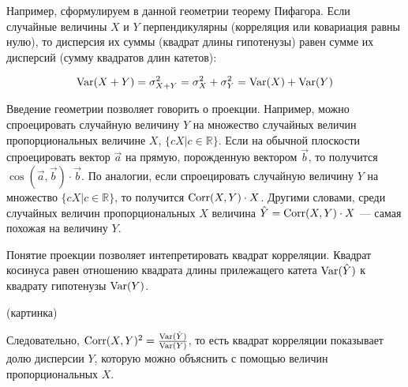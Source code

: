 \documentclass[10pt]{article}
\newcommand{\RR}{\mathbb{R}}
\begin{document}
Например, сформулируем в данной геометрии теорему Пифагора. Если случайные величины $X$ и $Y$ перпендикулярны (корреляция или ковариация равны нулю), то дисперсия их суммы (квадрат длины гипотенузы) равен сумме их дисперсий (сумму квадратов длин катетов):

\[
\operatorname{Var}(X+Y)=\sigma^2_{X+Y}=\sigma^2_X+\sigma^2_Y=\operatorname{Var}(X)+\operatorname{Var}(Y)
\]

\begin{center}
\end{center}

Введение геометрии позволяет говорить о проекции. Например, можно спроецировать случайную величину $Y$ на множество случайных величин пропорциональных величине $X$, $\{cX | c\in \RR \}$. Если на обычной плоскости спроецировать вектор $\vec{a}$ на прямую, порожденную вектором $\vec{b}$, то получится $\cos(\vec{a},\vec{b})\cdot \vec{b}$. По аналогии, если спроецировать случайную величину $Y$ на множество $\{cX | c\in \RR \}$, то получится $\operatorname{Corr}(X,Y)\cdot X$. Другими словами, среди случайных величин пропорциональных $X$ величина  $\hat{Y}=\operatorname{Corr}(X,Y)\cdot X$ --- самая похожая на величину $Y$.

Понятие проекции позволяет интепретировать квадрат корреляции. Квадрат косинуса равен отношению квадрата длины прилежащего катета $\operatorname{Var}(\hat{Y})$ к квадрату гипотенузы $\operatorname{Var}(Y)$.

(картинка)

Следовательно, $\operatorname{Corr}(X,Y)^2=\frac{\operatorname{Var}(\hat{Y})}{\operatorname{Var}(Y)}$, то есть квадрат корреляции показывает долю дисперсии $Y$, которую можно объяснить с помощью величин пропорциональных $X$. 
\end{document}
